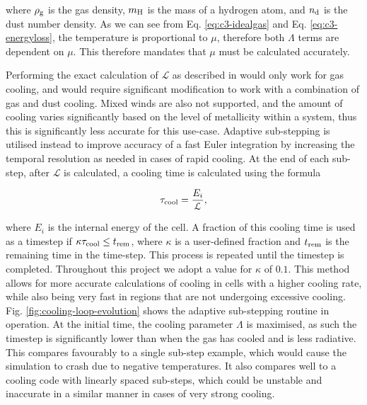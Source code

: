 \noindent
where $\rho_\text{g}$ is the gas density,
$m_\text{H}$ is the mass of a hydrogen atom,
and
$n_\text{d}$ is the dust number density.
As we can see from Eq. \ref{eq:c3-idealgas} and Eq. \ref{eq:c3-energyloss}, the temperature is proportional to $\mu$, therefore both $\Lambda$ terms are dependent on $\mu$.
This therefore mandates that $\mu$ must be calculated accurately.


Performing the exact calculation of $\mathcal{L}$ as described in \textcite{townsendExactIntegrationScheme2009} would only work for gas cooling, and would require significant modification to work with a combination of gas and dust cooling.
Mixed winds are also not supported, and the amount of cooling varies significantly based on the level of metallicity within a system, thus this is significantly less accurate for this use-case.
Adaptive sub-stepping is utilised instead to improve accuracy of a fast Euler integration by increasing the temporal resolution as needed in cases of rapid cooling.
At the end of each sub-step, after $\mathcal{L}$ is calculated, a cooling time is calculated using the formula

\begin{equation}
  \label{eq:substepinterval}
  \tau_\text{cool} = \frac{E_i}{\mathcal{L}} ,
\end{equation}

\noindent
where $E_i$ is the internal energy of the cell.
A fraction of this cooling time is used as a timestep if $\kappa \tau_\text{cool} \leq t_\text{rem}$, where $\kappa$ is a user-defined fraction and $t_\text{rem}$ is the remaining time in the time-step.
This process is repeated until the timestep is completed.
Throughout this project we adopt a value for $\kappa$ of $0.1$.
This method allows for more accurate calculations of cooling in cells with a higher cooling rate, while also being very fast in regions that are not undergoing excessive cooling.
Fig. \ref{fig:cooling-loop-evolution} shows the adaptive sub-stepping routine in operation.
At the initial time, the cooling parameter $\Lambda$ is maximised, as such the timestep is significantly lower than when the gas has cooled and is less radiative.
This compares favourably to a single sub-step example, which would cause the simulation to crash due to negative temperatures.
It also compares well to a cooling code with linearly spaced sub-steps, which could be unstable and inaccurate in a similar manner in cases of very strong cooling.

